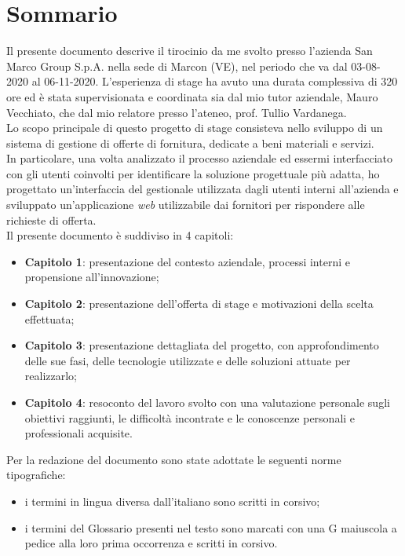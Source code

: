 
\cleardoublepage
{}
{}
\begingroup
\let\clearpage\relax
\let\cleardoublepage\relax
\let\cleardoublepage\relax

\chapter*{Sommario}

Il presente documento descrive il tirocinio da me svolto presso l'azienda San Marco Group S.p.A. nella sede di Marcon (VE), nel periodo che va dal 03-08-2020 al 06-11-2020. L'esperienza di stage ha avuto una durata complessiva di 320 ore ed è stata supervisionata e coordinata sia dal mio tutor aziendale, Mauro Vecchiato, che dal mio relatore presso l'ateneo, prof. Tullio Vardanega.\\
Lo scopo principale di questo progetto di stage consisteva nello sviluppo di un sistema di gestione di offerte di fornitura, dedicate a beni materiali e servizi.\\
In particolare, una volta analizzato il processo aziendale ed essermi interfacciato con gli utenti coinvolti per identificare la soluzione progettuale più adatta, ho progettato un'interfaccia del gestionale utilizzata dagli utenti interni all'azienda e sviluppato un'applicazione \textit{web} utilizzabile dai fornitori per rispondere alle richieste di offerta.\\
Il presente documento è suddiviso in 4 capitoli:
\begin{itemize}
	\item \textbf{Capitolo 1}: presentazione del contesto aziendale, processi interni e propensione all'innovazione;
	\item \textbf{Capitolo 2}: presentazione dell'offerta di stage e motivazioni della scelta effettuata; 
	\item \textbf{Capitolo 3}: presentazione dettagliata del progetto, con approfondimento delle sue fasi, delle tecnologie utilizzate e delle soluzioni attuate per realizzarlo;
	\item \textbf{Capitolo 4}: resoconto del lavoro svolto con una valutazione personale sugli obiettivi raggiunti, le difficoltà incontrate e le conoscenze personali e professionali acquisite.
\end{itemize}
Per la redazione del documento sono state adottate le seguenti norme tipografiche:
\begin{itemize}
\item i termini in lingua diversa dall'italiano sono scritti in corsivo;
\item i termini del Glossario presenti nel testo sono marcati con una G maiuscola a
pedice alla loro prima occorrenza e scritti in corsivo.
\end{itemize}

\vfill
%
%

\endgroup			

\vfill


